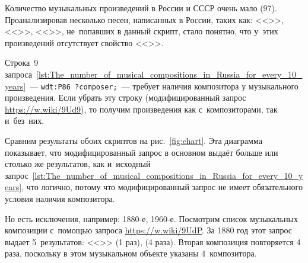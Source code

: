 Количество музыкальных произведений в России и СССР очень мало (97). 
Проанализировав несколько песен, написанных в России, таких как: 
<<>>, 
<<>>, 
<<>>, 
не~попавших в данный скрипт, стало понятно, 
что у~этих произведений отсутствует свойство <<>>.

Строка~9 запроса~\ref{lst:The_number_of_musical_compositions_in_Russia_for_every_10_years}~---  
\lstinline|wdt:P86 ?composer;|~--- 
требует наличия композитора у музыкального произведения. 
Если убрать эту строку (модифицированный запрос \href{https://w.wiki/9Ud9}
                                                     {https://w.wiki/9Ud9}), 
то получим произведения как с~композиторами, так и~без~них. 

Сравним результаты обоих скриптов на рис.~\ref{fig:chart}. 
Эта диаграмма показывает, что модифицированный запрос 
в основном выдаёт больше или столько же результатов, 
как и~исходный запрос~\ref{lst:The_number_of_musical_compositions_in_Russia_for_every_10_years}, 
что логично, потому что модифицированный запрос не имеет обязательного условия наличия композитора. 

Но есть исключения, например: 1880-е, 1960-е. 
Посмотрим список музыкальных композиции с~помощью запроса \href{https://w.wiki/9UdP}
                                                               {https://w.wiki/9UdP}. 
За 1880 год этот запрос выдает 5~результатов: 
<<>> (1 раз), 
 (4 раза). 
Вторая композиция повторяется 4 раза, поскольку в этом музыкальном объекте указаны 4~композитора. 




